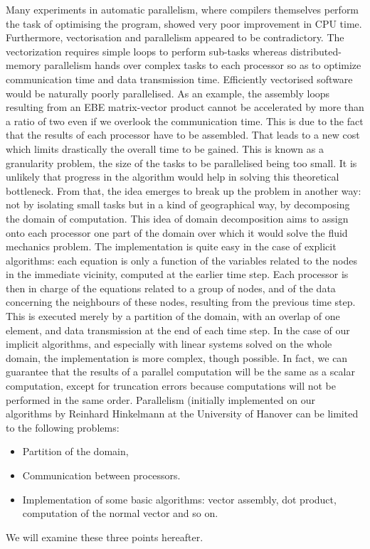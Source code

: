 Many experiments in automatic parallelism, where compilers themselves perform
the task of optimising the program, showed very poor improvement in CPU time.
Furthermore, vectorisation and parallelism appeared to be contradictory.
The vectorization requires simple loops to perform sub-tasks whereas
distributed-memory parallelism hands over complex tasks to each processor so as
to optimize communication time and data transmission time. Efficiently
vectorised software would be naturally poorly parallelised. As an example, the
assembly loops resulting from an EBE matrix-vector product cannot be
accelerated by more than a ratio of two even if we overlook the communication
time. This is due to the fact that the results of each processor have to be
assembled. That leads to a new cost which limits drastically the overall time
to be gained. This is known as a granularity problem, the size of the tasks to
be parallelised being too small. It is unlikely that progress in the algorithm
would help in solving this theoretical bottleneck. From that, the idea emerges
to break up the problem in another way: not by isolating small tasks but in a
kind of geographical way, by decomposing the domain of computation. This idea
of domain decomposition aims to assign onto each processor one part of the
domain over which it would solve the fluid mechanics problem. The
implementation is quite easy in the case of explicit algorithms: each equation
is only a function of the variables related to the nodes in the immediate
vicinity, computed at the earlier time step. Each processor is then in charge
of the equations related to a group of nodes, and of the data concerning the
neighbours of these nodes, resulting from the previous time step. This is
executed merely by a partition of the domain, with an overlap of one element,
and data transmission at the end of each time step. In the case of our implicit
algorithms, and especially with linear systems solved on the whole domain, the
implementation is more complex, though possible. In fact, we can guarantee that
the results of a parallel computation will be the same as a scalar computation,
except for truncation errors because computations will not be performed in the
same order. Parallelism (initially implemented on our algorithms by Reinhard
Hinkelmann at the University of Hanover can be limited to the following
problems:
\begin{itemize}
  \item Partition of the domain,
  \item Communication between processors.
  \item Implementation of some basic algorithms: vector assembly, dot product,
    computation of the normal vector and so on.
\end{itemize}
We will examine these three points hereafter.

